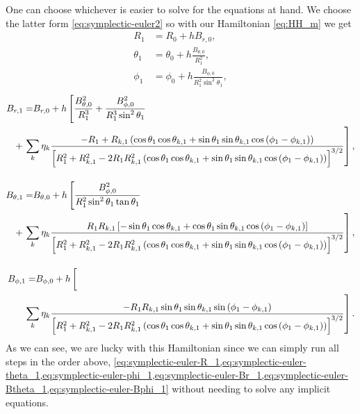 One can choose whichever is easier to solve for the equations at hand. We choose the latter form \cref{eq:symplectic-euler2} so with our Hamiltonian \cref{eq:HH_m} we get
\begin{align}
    R_1 &= R_0 + h B_{r,0} \label{eq:symplectic-euler-R_1}, \\[0.4cm]
    \theta_1 &= \theta_0 + h \frac{B_{\theta,0}}{R_1^2}, \label{eq:symplectic-euler-theta_1} \\[0.4cm]
    \phi_1 &= \phi_0 + h \frac{B_{\phi,0}}{R_1^2 \sin^2{\theta_1}}, \label{eq:symplectic-euler-phi_1}
\end{align}
\begin{align}    
    \begin{aligned}
        B_{r,1} = & B_{r,0} + h \left[ \frac{B_{\theta,0}^2}{R_1^3} + \frac{B_{\phi,0}^2}{R_1^3 \sin^2{\theta_1}} \right. \\
        & \hspace{-21.0pt} + \left. \sum\limits_{k} \eta_k \frac{-R_1 + R_{k,1} \left(\cos{\theta_1}\cos{\theta_{k,1}} + \sin{\theta_1}\sin{\theta_{k,1}}\cos{(\phi_1 - \phi_{k,1})}\right)}{\left[R_1^2 + R_{k,1}^2 -2 R_1 R_{k,1}^2 \left(\cos{\theta_1}\cos{\theta_{k,1}} + \sin{\theta_1}\sin{\theta_{k,1}}\cos{(\phi_1 - \phi_{k,1})} \right) \right]^{3/2}} \right] , \label{eq:symplectic-euler-Br_1}
    \end{aligned} \\[0.4cm]
    \begin{aligned}
        B_{\theta,1} = & B_{\theta,0} + h \left[ \frac{B_{\phi,0}^2}{R_1^2 \sin^2{\theta_1} \tan{\theta_1}} \right. \\
        & \hspace{-21.0pt} + \left. \sum\limits_{k} \eta_k \frac{R_1 R_{k,1} \left[-\sin{\theta_1}\cos{\theta_{k,1}} + \cos{\theta_1}\sin{\theta_{k,1}}\cos{(\phi_1 - \phi_{k,1})} \right]}{\left[R_1^2 + R_{k,1}^2 -2 R_1 R_{k,1}^2 \left(\cos{\theta_1}\cos{\theta_{k,1}} + \sin{\theta_1}\sin{\theta_{k,1}}\cos{(\phi_1 - \phi_{k,1})} \right) \right]^{3/2}} \right], \label{eq:symplectic-euler-Btheta_1}
    \end{aligned} \\[0.4cm]
    \begin{aligned}
        B_{\phi,1} = & B_{\phi,0} + h \left[ \vphantom{\frac12} \right.\\
        & \hspace{-21.0pt} \hphantom{+} \left. \sum\limits_{k} \eta_k \frac{- R_1 R_{k,1} \sin{\theta_1}\sin{\theta_{k,1}}\sin{(\phi_1 - \phi_{k,1})}}{\left[R_1^2 + R_{k,1}^2 -2 R_1 R_{k,1}^2 \left(\cos{\theta_1}\cos{\theta_{k,1}} + \sin{\theta_1}\sin{\theta_{k,1}}\cos{(\phi_1 - \phi_{k,1})} \right) \right]^{3/2}} \right]. \label{eq:symplectic-euler-Bphi_1}
    \end{aligned}
\end{align}
As we can see, we are lucky with this Hamiltonian since we can simply run all steps in the order above, \cref{eq:symplectic-euler-R_1,eq:symplectic-euler-theta_1,eq:symplectic-euler-phi_1,eq:symplectic-euler-Br_1,eq:symplectic-euler-Btheta_1,eq:symplectic-euler-Bphi_1} without needing to solve any implicit equations.


